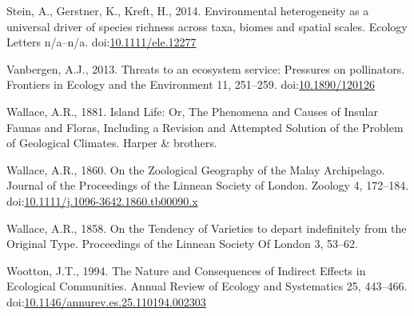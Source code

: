\hypertarget{ref-Stein2014}{}
Stein, A., Gerstner, K., Kreft, H., 2014. Environmental heterogeneity as
a universal driver of species richness across taxa, biomes and spatial
scales. Ecology Letters n/a--n/a.
doi:\href{https://doi.org/10.1111/ele.12277}{10.1111/ele.12277}

\hypertarget{ref-Vanbergen2013}{}
Vanbergen, A.J., 2013. Threats to an ecosystem service: Pressures on
pollinators. Frontiers in Ecology and the Environment 11, 251--259.
doi:\href{https://doi.org/10.1890/120126}{10.1890/120126}

\hypertarget{ref-wallace1881island}{}
Wallace, A.R., 1881. Island Life: Or, The Phenomena and Causes of
Insular Faunas and Floras, Including a Revision and Attempted Solution
of the Problem of Geological Climates. Harper \& brothers.

\hypertarget{ref-Wallace1860}{}
Wallace, A.R., 1860. On the Zoological Geography of the Malay
Archipelago. Journal of the Proceedings of the Linnean Society of
London. Zoology 4, 172--184.
doi:\href{https://doi.org/10.1111/j.1096-3642.1860.tb00090.x}{10.1111/j.1096-3642.1860.tb00090.x}

\hypertarget{ref-Wallace1858}{}
Wallace, A.R., 1858. On the Tendency of Varieties to depart indefinitely
from the Original Type. Proceedings of the Linnean Society Of London 3,
53--62.

\hypertarget{ref-Wootton1994a}{}
Wootton, J.T., 1994. The Nature and Consequences of Indirect Effects in
Ecological Communities. Annual Review of Ecology and Systematics 25,
443--466.
doi:\href{https://doi.org/10.1146/annurev.es.25.110194.002303}{10.1146/annurev.es.25.110194.002303}
